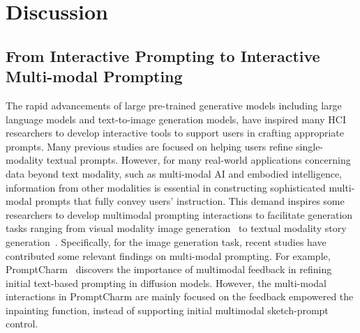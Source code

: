 \section{Discussion}\label{sec:discussion}



\subsection{From Interactive Prompting to Interactive Multi-modal Prompting}
The rapid advancements of large pre-trained generative models including large language models and text-to-image generation models, have inspired many HCI researchers to develop interactive tools to support users in crafting appropriate prompts.
Many previous studies are focused on helping users refine single-modality textual prompts.
However, for many real-world applications concerning data beyond text modality, such as multi-modal AI and embodied intelligence, information from other modalities is essential in constructing sophisticated multi-modal prompts that fully convey users' instruction.
This demand inspires some researchers to develop multimodal prompting interactions to facilitate generation tasks ranging from visual modality image generation~\cite{wang2024promptcharm, promptpaint} to textual modality story generation~\cite{chung2022tale}.
Specifically, for the image generation task, recent studies have contributed some relevant findings on multi-modal prompting.
For example, PromptCharm~\cite{wang2024promptcharm} discovers the importance of multimodal feedback in refining initial text-based prompting in diffusion models.
However, the multi-modal interactions in PromptCharm are mainly focused on the feedback empowered the inpainting function, instead of supporting initial multimodal sketch-prompt control. 


